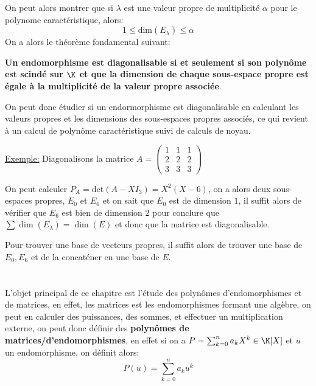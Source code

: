 On peut alors montrer que si \(\lambda\) est une valeur propre de multiplicité \(\alpha\) pour le polynome caractéristique, alors:
\[
   1 \leq \text{dim}(E_\lambda) \leq \alpha   
\]
On a alors le théorème fondamental suivant:
\begin{center}
   \textbf{Un endomorphisme est diagonalisable si et seulement si son polynôme est scindé sur \(\K\) et que la dimension de chaque sous-espace propre est égale à la multiplicité de la valeur propre associée}.
\end{center}
On peut donc étudier si un endormorphisme est diagonalisable en calculant les valeurs propres et les dimensions des sous-espaces propres associés, ce qui revient à un calcul de polynôme caractéristique suivi de calculs de noyau.

\underline{Exemple:} Diagonalisons la matrice \(A = \left(\begin{array}{ccc}
   1 & 1 & 1\\
   2 & 2 & 2\\
   3 & 3 & 3
\end{array}\right) \)\< 

On peut calculer \(P_A = \text{det}(A - XI_3) = X^2(X-6)\), on a alors deux sous-espaces propres, \(E_0\) et \(E_6\) et on sait que \(E_0\) est de dimension \(1\), il suffit alors de vérifier que \(E_6\) est bien de dimension \(2\) pour conclure que \(\sum \dim(E_\lambda) = \dim(E)\) et donc que la matrice est diagonalisable.\<

Pour trouver une base de vecteurs propres, il suffit alors de trouver une base de \(E_0, E_6\) et de la concaténer en une base de \(E\).
\chapter*{}
L'objet principal de ce chapitre est l'étude des polynômes d'endomorphismes et de matrices, en effet, les matrices est les endomorphismes formant une algèbre, on peut en calculer des puissances, des sommes, et effectuer un multiplication externe, on peut donc définir des \textbf{polynômes de matrices/d'endomorphismes}, en effet si on a \(P = \sum_{k=0}^{n} a_kX^k \in \K[X]\) et \(u\) un endomorphisme, on définit alors:
\[
   P(u) = \sum_{k=0}^{n}a_k u^k  
\]
